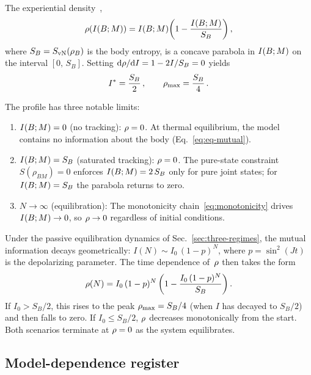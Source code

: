 The experiential density~\cite{Paper5},
\begin{equation}
  \rho(I(B;M))
  = I(B;M)\!\left(1 - \frac{I(B;M)}{S_B}\right),
  \label{eq:rho-profile}
\end{equation}
where $S_B = S_{\mathrm{vN}}(\rho_B)$ is the body entropy, is a concave
parabola in $I(B;M)$ on the interval $[0,\, S_B]$.  Setting
$\mathrm{d}\rho/\mathrm{d}I = 1 - 2I/S_B = 0$ yields
\begin{equation}
  I^{*} = \frac{S_B}{2}\,,
  \qquad
  \rho_{\max} = \frac{S_B}{4}\,.
  \label{eq:rho-peak}
\end{equation}

The profile has three notable limits:
\begin{enumerate}
  \item $I(B;M) = 0$ (no tracking):
    $\rho = 0$.  At thermal equilibrium, the model contains no
    information about the body
    (Eq.~\eqref{eq:eq-mutual}).
  \item $I(B;M) = S_B$ (saturated tracking):
    $\rho = 0$.  The pure-state constraint
    $S(\rho_{BM}) = 0$ enforces $I(B;M) = 2\,S_B$ only for
    pure joint states; for $I(B;M) = S_B$ the parabola returns
    to zero.
  \item $N \to \infty$ (equilibration):
    The monotonicity chain~\eqref{eq:monotonicity} drives
    $I(B;M)\to 0$, so $\rho\to 0$ regardless of initial
    conditions.
\end{enumerate}

Under the passive equilibration dynamics of
Sec.~\ref{sec:three-regimes}, the mutual information decays
geometrically: $I(N) \sim I_0\,(1-p)^N$, where
$p = \sin^2(Jt)$ is the depolarizing parameter.
The time dependence of~$\rho$ then takes the form
\begin{equation}
  \rho(N) = I_0\,(1-p)^N
    \left(1 - \frac{I_0\,(1-p)^N}{S_B}\right).
  \label{eq:rho-time}
\end{equation}
If $I_0 > S_B/2$, this rises to the peak $\rho_{\max} = S_B/4$
(when $I$ has decayed to $S_B/2$) and then falls to zero.  If
$I_0 \leq S_B/2$, $\rho$ decreases monotonically from the start.
Both scenarios terminate at $\rho = 0$ as the system
equilibrates.

\subsection{Model-dependence register}\label{sec:model-dep}

